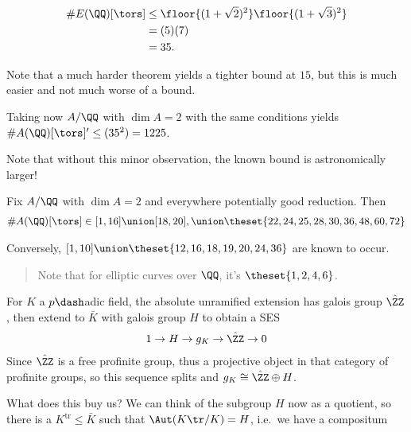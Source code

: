 \begin{align*}
  \# E(\QQ)[\tors] 
  &\leq \floor{(1 + \sqrt 2)^2  } \floor{ (1 + \sqrt 3)^2 } \\
  &= (5)(7) \\
  &= 35
  .\end{align*}

Note that a much harder theorem yields a tighter bound at \(15\), but
this is much easier and not much worse of a bound.

Taking now \(A/\QQ\) with \(\dim A = 2\) with the same conditions yields
\(\# A(\QQ)[\tors]' \leq (35^2) = 1225\).

Note that without this minor observation, the known bound is
astronomically larger!

\begin{description}
\tightlist
\item[Theorem (C-Xarles)]
Fix \(A/\QQ\) with \(\dim A = 2\) and everywhere potentially good
reduction. Then
\begin{align*}
  \# A(\QQ)[\tors] \in [1, 16] \union [18, 20], \union \theset{22, 24, 25, 28, 30, 36, 48, 60, 72}
  \end{align*}
\end{description}

Conversely, \([1, 10] \union \theset{12, 16, 18, 19 ,20, 24, 36}\) are
known to occur.

\begin{quote}
Note that for elliptic curves over \(\QQ\), it's \(\theset{1,2,4,6}\).
\end{quote}

\begin{description}
\tightlist
\item[Proof (Sketch)]
For \(K\) a \(p\dash\)adic field, the absolute unramified extension has
galois group \(\hat \ZZ\), then extend to \(\bar K\) with galois group
\(H\) to obtain a SES
\begin{align*}
  1 \to H \to g_K \to \hat \ZZ \to 0
  \end{align*} Since \(\hat \ZZ\) is a free profinite group, thus a
projective object in that category of profinite groups, so this sequence
splits and \(g_K \cong \hat \ZZ \oplus H\).
\end{description}

What does this buy us? We can think of the subgroup \(H\) now as a
quotient, so there is a \(K^{\mathrm{tr}} \leq \bar K\) such that
\(\Aut(K\tr/K) = H\), i.e.~we have a compositum

\begin{center}\end{center}

